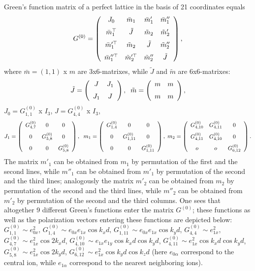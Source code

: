Green's function matrix of a perfect lattice in the basis of 21 coordinates
equals
\[ G^{(0)} = \left (\begin{array}{cccc}
J_0&\bar{m}_1&\bar{m}'_1&\bar{m}''_1\\\noalign{\medskip}
\bar{m}_1^{\top}&\tilde{J}&\tilde{m}_2&\tilde{m}'_2\\\noalign{\medskip}
\bar{m}_{1}^{\prime\top}&\tilde{m}_2&\tilde{J}&\tilde{m}''_2\\
\noalign{\medskip}
\bar{m}_1^{\prime\prime\top}&\tilde{m}_2^{\prime\top}&\tilde{m}''_2&\tilde{J}
\end{array}
\right ) , \]
where $\bar{m} = (1,1)$ x $m$ are 3x6-matrixes, while $\tilde{J}$ and
$\tilde{m}$ are 6x6-matrixes:
\[ \tilde{J} = \left (\begin{array}{cc}
J&J_1\\\noalign{\medskip}
J_1&J\end{array}\right ) , \;\;
\tilde{m} = \left (\begin{array}{cc}
m&m\\\noalign{\medskip}m&m\end{array}\right ) ,\]
$J_0 = G^{(0)}_{1,1}$ x $I_3$, $J = G^{(0)} _{4,4}$ x $I_3$, 
\[ J_1 = \left (\begin{array}{ccc}
G^{(0)}_{4,7}&0&0\\\noalign{\medskip}0&G^{(0)}_{5,8}&0\\\noalign{\medskip}0
&0&G^{(0)}_{5,8}\end {array}\right ),\;\;
m_1 = \left (\begin{array}{ccc}
G^{(0)}_{1,4}&0&0\\\noalign{\medskip}0&G^{(0)}_{1,11}&0\\\noalign{\medskip}0
&0&G^{(0)}_{1,11}\end {array}\right ),\;
m_2 = \left (\begin{array}{ccc}
G^{(0)}_{4,10}&G^{(0)}_{4,11}&0\\\noalign{\medskip}
G^{(0)}_{4,11}&G^{(0)}_{4,10}&0\\\noalign{\medskip}
o&o&G^{(0)}_{6,12}\end{array}\right ) .\]
The matrix $m'_1$ can be obtained from $m_1$ by permutation of the first and
the second lines, while $m''_1$ can be obtained from $m'_1$ by permutation of 
the second and the third lines; analogously the matrix $m'_2$ can be obtained
from $m_2$ by permutation of the second and the third lines, while $m''_2$ can
be obtained from $m'_2$ by permutation of the second and the third columns.
One sees that altogether 9 different Green's functions enter the matrix 
$G^{(0)}$; these functions as well as the polarization vectors entering these 
functions are depicted below: 
$G^{(0)}_{1,1} \sim e_{0x}^2$, 
$G^{(0)}_{1,4} \sim e_{0x}e_{1x}\cos{k_xd}$, 
$G^{(0)}_{1,11} \sim e_{0x}e_{1x}\cos{k_yd}$, 
$G^{(0)}_{4,4} \sim e_{1x}^2$, 
$G^{(0)}_{4,7} \sim e_{1x}^2\cos{2k_xd}$, 
$G^{(0)}_{4,10} \sim e_{1x} e_{1y}\cos{k_xd}\cos{k_yd}$,
$G^{(0)}_{4,11} \sim e_{1x}^2\cos{k_xd}\cos{k_yd}$,
$G^{(0)}_{5,8} \sim e_{1x}^2\cos{2k_yd}$, 
$G^{(0)}_{6,12} \sim e_{1x}^2\cos{k_yd}\cos{k_zd}$ 
(here $e_{0\alpha}$ correspond to the central ion, while $e_{1\alpha}$ 
correspond to the nearest neighboring ions).

